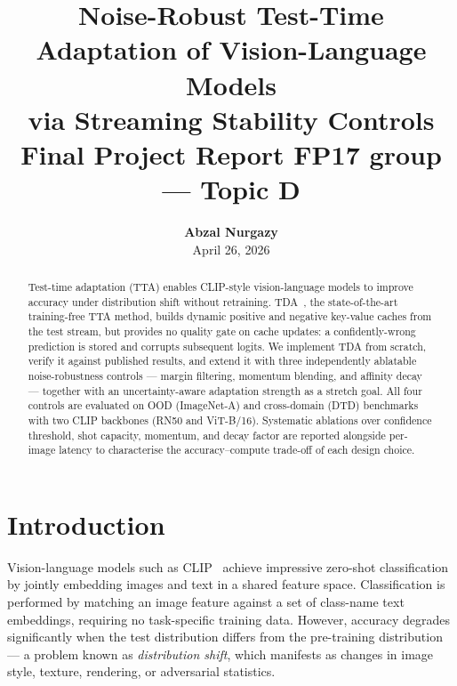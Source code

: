 \documentclass[10pt,twocolumn,letterpaper]{article}
\begin{document}
\title{%
  Noise-Robust Test-Time Adaptation of Vision-Language Models\\[-1pt]
  via Streaming Stability Controls\\[2pt]
  {\large Final Project Report FP17 group --- Topic D}%
}
\author{\textbf{Abzal Nurgazy} \\ \small April 26, 2026}
\date{}
\maketitle
\thispagestyle{empty}

\begin{abstract}
Test-time adaptation (TTA) enables CLIP-style vision-language models
to improve accuracy under distribution shift without retraining.
TDA~\cite{karmanov2024tda}, the state-of-the-art training-free TTA
method, builds dynamic positive and negative key-value caches from the
test stream, but provides no quality gate on cache updates: a
confidently-wrong prediction is stored and corrupts subsequent logits.
We implement TDA from scratch, verify it against published results,
and extend it with three independently ablatable noise-robustness
controls --- margin filtering, momentum blending, and affinity decay
--- together with an uncertainty-aware adaptation strength as a
stretch goal.
All four controls are evaluated on OOD (ImageNet-A) and cross-domain
(DTD) benchmarks with two CLIP backbones (RN50 and ViT-B/16).
Systematic ablations over confidence threshold, shot capacity,
momentum, and decay factor are reported alongside per-image latency
to characterise the accuracy--compute trade-off of each design choice.
\end{abstract}

\section{Introduction}
\label{sec:intro}

Vision-language models such as CLIP~\cite{radford2021clip} achieve
impressive zero-shot classification by jointly embedding images and
text in a shared feature space.
Classification is performed by matching an image feature against a
set of class-name text embeddings, requiring no task-specific
training data.
However, accuracy degrades significantly when the test distribution
differs from the pre-training distribution --- a problem known as
\emph{distribution shift}, which manifests as changes in image style,
texture, rendering, or adversarial statistics.
\end{document}
